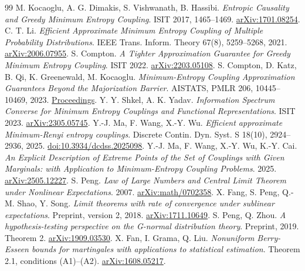 \documentclass[11pt,a4paper]{article}
\begin{document}
\begin{thebibliography}{99}
 M. Kocaoglu, A. G. Dimakis, S. Vishwanath, B. Hassibi.
\emph{Entropic Causality and Greedy Minimum Entropy Coupling}.
ISIT 2017, 1465--1469.
\href{https://arxiv.org/abs/1701.08254}{arXiv:1701.08254}.
 C. T. Li.
\emph{Efficient Approximate Minimum Entropy Coupling of Multiple
Probability Distributions}. IEEE Trans. Inform. Theory 67(8),
5259--5268, 2021. \href{https://arxiv.org/abs/2006.07955}{arXiv:2006.07955}.
 S. Compton.
\emph{A Tighter Approximation Guarantee for Greedy Minimum Entropy Coupling}.
ISIT 2022. \href{https://arxiv.org/abs/2203.05108}{arXiv:2203.05108}.
 S. Compton, D. Katz, B. Qi, K. Greenewald, M. Kocaoglu.
\emph{Minimum-Entropy Coupling Approximation Guarantees Beyond the
Majorization Barrier}. AISTATS, PMLR 206, 10445--10469, 2023.
\href{https://proceedings.mlr.press/v206/compton23a.html}{Proceedings}.
 Y. Y. Shkel, A. K. Yadav.
\emph{Information Spectrum Converse for Minimum Entropy Couplings and
Functional Representations}. ISIT 2023.
\href{https://arxiv.org/abs/2305.05745}{arXiv:2305.05745}.
 Y.-J. Ma, F. Wang, X.-Y. Wu.
\emph{Efficient approximate Minimum-Renyi entropy couplings}.
Discrete Contin. Dyn. Syst. S 18(10), 2924--2936, 2025.
\href{https://doi.org/10.3934/dcdss.2025098}{doi:10.3934/dcdss.2025098}.
 Y.-J. Ma, F. Wang, X.-Y. Wu, K.-Y. Cai.
\emph{An Explicit Description of Extreme Points of the Set of Couplings
with Given Marginals: with Application to Minimum-Entropy Coupling Problems}.
2025. \href{https://arxiv.org/abs/2505.12227}{arXiv:2505.12227}.
 S. Peng.
\emph{Law of Large Numbers and Central Limit Theorem under Nonlinear
Expectations}. 2007.
\href{https://arxiv.org/abs/math/0702358}{arXiv:math/0702358}.
 X. Fang, S. Peng, Q.-M. Shao, Y. Song.
\emph{Limit theorems with rate of convergence under sublinear expectations}.
Preprint, version 2, 2018.
\href{https://arxiv.org/abs/1711.10649}{arXiv:1711.10649}.
 S. Peng, Q. Zhou.
\emph{A hypothesis-testing perspective on the G-normal distribution theory}.
Preprint, 2019.
Theorem 2. \href{https://arxiv.org/abs/1909.03530}{arXiv:1909.03530}.
 X. Fan, I. Grama, Q. Liu.
\emph{Nonuniform Berry-Esseen bounds for martingales with applications
to statistical estimation}. Theorem 2.1, conditions (A1)--(A2).
\href{https://arxiv.org/abs/1608.05217}{arXiv:1608.05217}.
\end{thebibliography}
\end{document}
